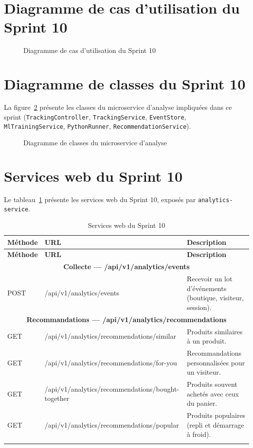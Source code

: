\section{Diagramme de cas d'utilisation du Sprint 10}
\begin{figure}[H]
    \centering
    \caption{Diagramme de cas d'utilisation du Sprint 10}
    \label{fig:cu-sprint10}
\end{figure}

\section{Diagramme de classes du Sprint 10}
La figure~\ref{fig:classes-ml} présente les classes du microservice d'analyse impliquées dans ce sprint (\texttt{TrackingController}, \texttt{TrackingService}, \texttt{EventStore}, \texttt{MlTrainingService}, \texttt{PythonRunner}, \texttt{RecommendationService}).
\begin{figure}[H]
    \centering
    \caption{Diagramme de classes du microservice d'analyse}
    \label{fig:classes-ml}
\end{figure}

\section{Services web du Sprint 10}
Le tableau~\ref{tab:ws-sprint10} présente les services web du Sprint 10, exposés par \texttt{analytics-service}.
\renewcommand{\arraystretch}{1.15}
\setlength{\tabcolsep}{4pt}
\begin{longtable}{|p{2.5cm}|p{9.8cm}|p{3.2cm}|}
\hline
\textbf{Méthode} & \textbf{URL} & \textbf{Description} \\
\hline
\endfirsthead
\hline
\textbf{Méthode} & \textbf{URL} & \textbf{Description} \\
\hline
\endhead
\multicolumn{3}{|c|}{\textbf{Collecte --- /api/v1/analytics/events}} \\
\hline
POST & /api/v1/analytics/events & Recevoir un lot d'événements (boutique, visiteur, session). \\
\hline
\multicolumn{3}{|c|}{\textbf{Recommandations --- /api/v1/analytics/recommendations}} \\
\hline
GET & /api/v1/analytics/recommendations/similar & Produits similaires à un produit. \\
\hline
GET & /api/v1/analytics/recommendations/for-you & Recommandations personnalisées pour un visiteur. \\
\hline
GET & /api/v1/analytics/recommendations/bought-together & Produits souvent achetés avec ceux du panier. \\
\hline
GET & /api/v1/analytics/recommendations/popular & Produits populaires (repli et démarrage à froid). \\
\hline
\caption{Services web du Sprint 10}
\label{tab:ws-sprint10}
\end{longtable}


